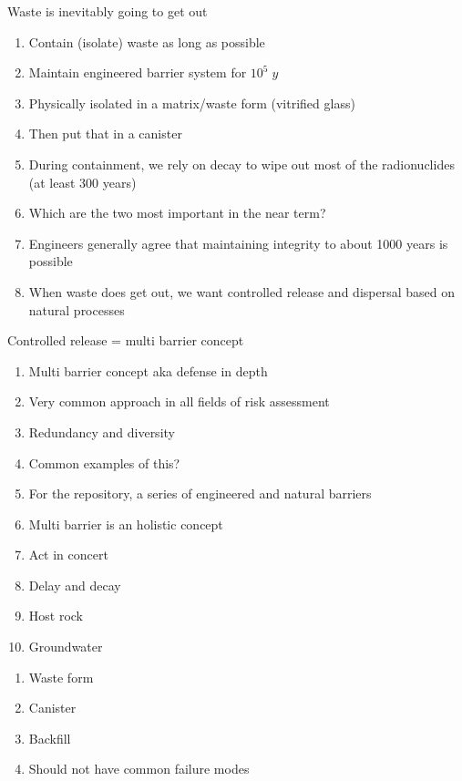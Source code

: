 \documentclass[aspectratio=1610,pdftex,dvipsnames,compress,xcolor={dvipsnames}]{beamer}
\begin{document}
\begin{frame}{Waste is inevitably going to get out}
    \begin{enumerate}[series=outerlist,topsep=0pt,itemsep=15pt,leftmargin=*,label=(\arabic*)]
        \item[]Contain (isolate) waste as long as possible
        \item[]Maintain engineered barrier system for $10^5 \; y$
        \item[]Physically isolated in a matrix/waste form (vitrified glass)
        \item[]Then put that in a canister
        \item[]During containment, we rely on decay to wipe out most of the radionuclides (at least 300 years)
        \item[]Which are the two most important in the near term?
        \item[]Engineers generally agree that maintaining integrity to about 1000 years is possible
        \item[]When waste does get out, we want controlled release and dispersal based on natural processes
    \end{enumerate}
\end{frame}


\begin{frame}{Controlled release = multi barrier concept}
    \begin{enumerate}[series=outerlist,topsep=0pt,itemsep=11pt,leftmargin=*,label=(\arabic*)]
        \item[]Multi barrier concept aka defense in depth
        \item[]Very common approach in all fields of risk assessment
        \item[]Redundancy and diversity
        \item[]Common examples of this?
        \item[]For the repository, a series of engineered and natural barriers
        \item[]Multi barrier is an holistic concept
        \item[]Act in concert
        \item[]Delay and decay
        \item[]Host rock
        \item[]Groundwater
    \end{enumerate}
\end{frame}


\begin{frame}[t]{}
    \begin{enumerate}[series=outerlist,topsep=0pt,itemsep=21pt,leftmargin=*,label=(\arabic*)]
        \item[]Waste form
        \item[]Canister
        \item[]Backfill
        \item[]Should not have common failure modes  
    \end{enumerate}
\end{frame}
\end{document}
